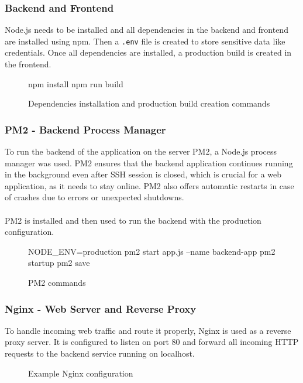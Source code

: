 \documentclass[a4paper,12pt]{report}
\begin{document}
\subsubsection{Backend and Frontend}
Node.js needs to be installed and all dependencies in the backend and frontend are installed using npm. Then a \texttt{.env} file is created to store sensitive data like credentials. Once all dependencies are installed, a production build is created in the frontend.
\begin{figure}[H]
	\begin{terminal}
		npm install
		npm run build
	\end{terminal}
	\caption{Dependencies installation and production build creation commands}
\end{figure}
\subsubsection{PM2 - Backend Process Manager}
To run the backend of the application on the server PM2, a Node.js process manager was used. PM2 ensures that the backend application continues running in the background even after SSH session is closed, which is crucial for a web application, as it needs to stay online. PM2 also offers automatic restarts in case of crashes due to errors or unexpected shutdowns.\\\\
PM2 is installed and then used to run the backend with the production configuration.
\begin{figure}[H]
	\begin{terminal}
		NODE_ENV=production pm2 start app.js --name backend-app
		pm2 startup
		pm2 save
	\end{terminal}
	\caption{PM2 commands}
\end{figure}
\subsubsection{Nginx - Web Server and Reverse Proxy}
To handle incoming web traffic and route it properly, Nginx is used as a reverse proxy server. It is configured to listen on port 80 and forward all incoming HTTP requests to the backend service running on localhost.
\begin{figure}[H]
	\caption{Example Nginx configuration}
\end{figure}
\end{document}
